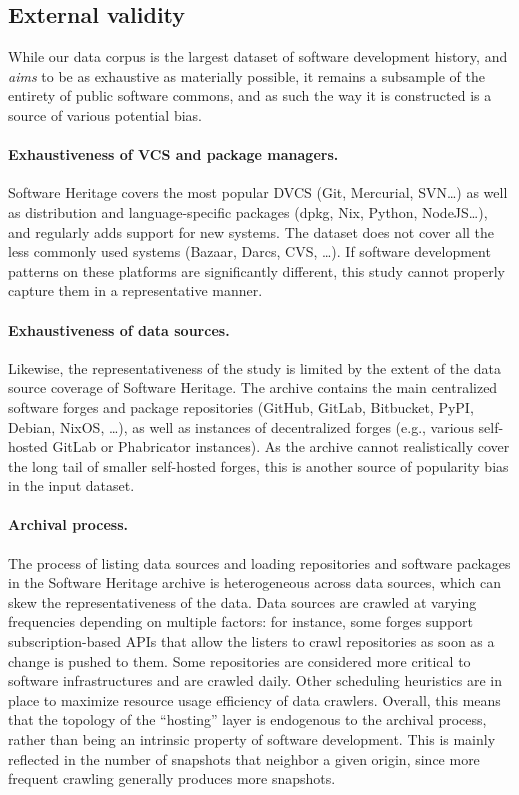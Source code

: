 \subsection{External validity}

While our data corpus is the largest dataset of software development history,
and \emph{aims} to be as exhaustive as materially possible, it remains a
subsample of the entirety of public software commons, and as such the way it is
constructed is a source of various potential bias.

\paragraph{Exhaustiveness of VCS and package managers.}
Software Heritage covers the most popular DVCS (Git, Mercurial, SVN…) as well
as distribution and language-specific packages (dpkg, Nix, Python, NodeJS…),
and regularly adds support for new systems. The dataset does not cover all the
less commonly used systems (Bazaar, Darcs, CVS, …). If software development
patterns on these platforms are significantly different, this study cannot
properly capture them in a representative manner.

\paragraph{Exhaustiveness of data sources.}
Likewise, the representativeness of the study is limited by the extent of the
data source coverage of Software Heritage. The archive contains the main
centralized software forges and package repositories (GitHub, GitLab,
Bitbucket, PyPI, Debian, NixOS, …), as well as instances of decentralized
forges (e.g., various self-hosted GitLab or Phabricator instances). As the
archive cannot realistically cover the long tail of smaller self-hosted forges,
this is another source of popularity bias in the input dataset.

\paragraph{Archival process.}
The process of listing data sources and loading repositories and software
packages in the Software Heritage archive is heterogeneous across data sources,
which can skew the representativeness of the data. Data sources are crawled
at varying frequencies depending on multiple factors: for instance, some forges
support subscription-based APIs that allow the listers to crawl repositories as
soon as a change is pushed to them. Some repositories are considered more
critical to software infrastructures and are crawled daily. Other scheduling
heuristics are in place to maximize resource usage efficiency of data crawlers.
Overall, this means that the topology of the ``hosting'' layer is endogenous to
the archival process, rather than being an intrinsic property of software
development. This is mainly reflected in the number of snapshots that neighbor
a given origin, since more frequent crawling generally produces more snapshots.

